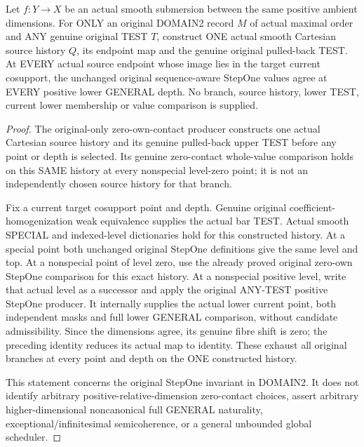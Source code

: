 \begin{theorem}
\label{hir:original-domain-two-any-test-all-stepone-etale-values}
\leanok
Let $f:Y\to X$ be an actual smooth submersion between the same positive
ambient dimensions. For ONLY an original DOMAIN2 record $M$ of actual
maximal order and ANY genuine original TEST $T$, construct ONE actual
smooth Cartesian source history $Q$, its endpoint map and the genuine
original pulled-back TEST. At EVERY actual source endpoint whose image
lies in the target current cosupport, the unchanged original
sequence-aware StepOne values agree at
EVERY positive lower GENERAL depth. No branch, source history, lower
TEST, current lower membership or value comparison is supplied.
\end{theorem}
\begin{proof}
The original-only zero-own-contact producer constructs one actual
Cartesian source history and its genuine pulled-back upper TEST before
any point or depth is selected. Its genuine zero-contact whole-value
comparison holds on this SAME history at every nonspecial level-zero
point; it is not an independently chosen source history for that branch.

Fix a current target cosupport point and depth. Genuine original
coefficient-homogenization weak equivalence supplies the actual bar TEST.
Actual smooth SPECIAL and indexed-level dictionaries hold for this
constructed history. At a special point both unchanged original StepOne
definitions give the same level and top. At a nonspecial point of level
zero, use the already proved original zero-own StepOne comparison for
this exact history. At a nonspecial positive level, write that actual
level as a successor and apply the original ANY-TEST positive StepOne
producer. It internally supplies the actual lower current point, both
independent masks and full lower GENERAL comparison, without candidate
admissibility. Since the dimensions agree, its genuine fibre shift is
zero; the preceding identity reduces its actual map to identity. These
exhaust all original branches at every point and depth on the ONE
constructed history.

This statement concerns the original StepOne invariant in DOMAIN2.
It does not identify arbitrary positive-relative-dimension zero-contact
choices, assert arbitrary higher-dimensional noncanonical full GENERAL
naturality, exceptional/infinitesimal semicoherence, or a general
unbounded global scheduler.
\end{proof}
